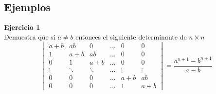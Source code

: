\documentclass{article}
\newenvironment{problem}[2][Ejercicio]
    { \begin{mdframed}[backgroundcolor=gray!20] \textbf{#1 #2} \\}
    {  \end{mdframed}}
\begin{document}
\subsection*{Ejemplos}
\begin{problem}{1}
    Demuestra que si $a\neq b$ entonces el siguiente determinante de $n\times n$
    \[
    \begin{vmatrix}
    a+ b & ab & 0 & \dots & 0 & 0 \\
    1 & a+b & ab & \dots & 0 & 0 \\
    0 & 1 & a+b & \dots & 0 & 0 \\
    \vdots & \ddots & \ddots & \dots & \vdots & \vdots \\
    0 & 0 & 0 & \dots & a+b & ab \\
    0 & 0 & 0 & \dots & 1 & a+b
    \end{vmatrix} =
    \frac{a^{n+1}-b^{n+1}}{a-b}
    \]
\end{problem}
\end{document}
